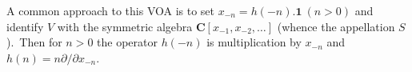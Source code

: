\documentclass[12pt]{amsart}
\theoremstyle{plain}
\theoremstyle{definition}
\theoremstyle{remark}
\newcommand{\CC}{\mathbf{C}}
\begin{document}
\medskip
A common approach to this VOA is to set $x_{-n}=h(-n).\mathbf{1}\ (n>0)$ and identify $V$ with the symmetric algebra $\CC[x_{-1}, x_{-2}, \hdots]$ (whence the appellation $S$).\ Then for
$n>0$ the operator $h(-n)$ is multiplication by $x_{-n}$ and $h(n)=n\partial/\partial x_{-n}$.



\end{document}
